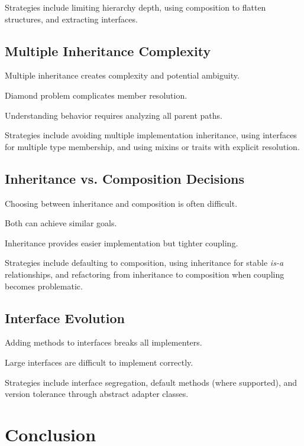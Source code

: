 \documentclass[11pt]{article}
\begin{document}
Strategies include limiting hierarchy depth, using composition to flatten structures, and extracting interfaces.

\subsection{Multiple Inheritance Complexity}

Multiple inheritance creates complexity and potential ambiguity.

Diamond problem complicates member resolution.

Understanding behavior requires analyzing all parent paths.

Strategies include avoiding multiple implementation inheritance, using interfaces for multiple type membership, and using mixins or traits with explicit resolution.

\subsection{Inheritance vs. Composition Decisions}

Choosing between inheritance and composition is often difficult.

Both can achieve similar goals.

Inheritance provides easier implementation but tighter coupling.

Strategies include defaulting to composition, using inheritance for stable \emph{is-a} relationships, and refactoring from inheritance to composition when coupling becomes problematic.

\subsection{Interface Evolution}

Adding methods to interfaces breaks all implementers.

Large interfaces are difficult to implement correctly.

Strategies include interface segregation, default methods (where supported), and version tolerance through abstract adapter classes.

\section{Conclusion}
\end{document}
